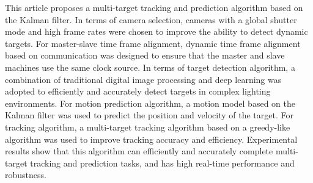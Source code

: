 \begin{eabstract}
  This article proposes a multi-target tracking 
  and prediction algorithm based on the Kalman filter. 
  In terms of camera selection, 
  cameras with a global shutter mode and high frame rates 
  were chosen to improve the ability to detect dynamic targets. 
  For master-slave time frame alignment, 
  dynamic time frame alignment based on communication was designed to ensure that the master and slave machines use the same clock source. In terms of target detection algorithm, a combination of traditional digital image processing and deep learning was adopted to efficiently and accurately detect targets in complex lighting environments. For motion prediction algorithm, a motion model based on the Kalman filter was used to predict the position and velocity of the target. For tracking algorithm, a multi-target tracking algorithm based on a greedy-like algorithm was used to improve tracking accuracy and efficiency. Experimental results show that this algorithm can efficiently and accurately complete multi-target tracking and prediction tasks, and has high real-time performance and robustness.
\end{eabstract}
